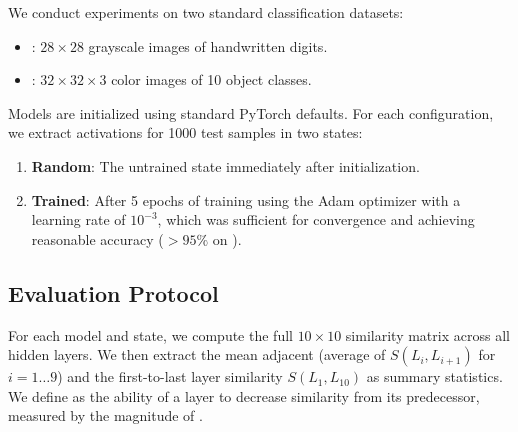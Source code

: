 We conduct experiments on two standard classification datasets:
\begin{itemize}[leftmargin=*,itemsep=0pt,topsep=0pt]
    \item \dsmnist: $28 \times 28$ grayscale images of handwritten digits.
    \item \dscifar: $32 \times 32 \times 3$ color images of 10 object classes.
\end{itemize}

Models are initialized using standard PyTorch defaults. For each configuration, we extract activations for 1000 test samples in two states:
\begin{enumerate}
    \item {\bf Random}: The untrained state immediately after initialization.
    \item {\bf Trained}: After 5 epochs of training using the Adam optimizer with a learning rate of $10^{-3}$, which was sufficient for convergence and achieving reasonable accuracy ($>95\%$ on \mnist).
\end{enumerate}

\subsection{Evaluation Protocol}
For each model and state, we compute the full $10 \times 10$ \cka similarity matrix across all hidden layers. We then extract the mean adjacent \cka (average of $S(L_i, L_{i+1})$ for $i=1 \dots 9$) and the first-to-last layer similarity $S(L_1, L_{10})$ as summary statistics. We define \transcap as the ability of a layer to decrease similarity from its predecessor, measured by the magnitude of \repdiv.
